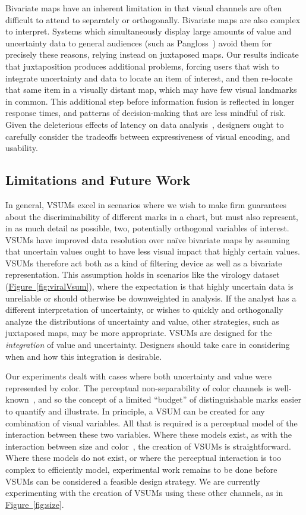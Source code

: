 \documentclass{vgtc}                          %
\newcommand{\figref}[1]{\hyperref[#1]{Figure~\ref*{#1}}}
\begin{document}
Bivariate maps have an inherent limitation in that visual channels are often difficult to attend to separately or orthogonally. Bivariate maps are also complex to interpret. Systems which simultaneously display large amounts of value and uncertainty data to general audiences (such as Pangloss~\cite{moritz2017trust}) avoid them for precisely these reasons, relying instead on juxtaposed maps. Our results indicate that juxtaposition produces additional problems, forcing users that wish to integrate uncertainty and data to locate an item of interest, and then re-locate that same item in a visually distant map, which may have few visual landmarks in common. This additional step before information fusion is reflected in longer response times, and patterns of decision-making that are less mindful of risk. Given the deleterious effects of latency on data analysis~\cite{liu2014effects}, designers ought to carefully consider the tradeoffs between expressiveness of visual encoding, and usability.

\subsection{Limitations and Future Work}
In general, VSUMs excel in scenarios where we wish to make firm guarantees about the discriminability of different marks in a chart, but must also represent, in as much detail as possible, two, potentially orthogonal variables of interest. VSUMs have improved data resolution over na\"ive bivariate maps by assuming that uncertain values ought to have less visual impact that highly certain values. VSUMs therefore act both as a kind of filtering device as well as a bivariate representation. This assumption holds in scenarios like the virology dataset (\figref{fig:viralVsum}), where the expectation is that highly uncertain data is unreliable or should otherwise be downweighted in analysis. If the analyst has a different interpretation of uncertainty, or wishes to quickly and orthogonally analyze the distributions of uncertainty and value, other strategies, such as juxtaposed maps, may be more appropriate. VSUMs are designed for the \emph{integration} of value and uncertainty. Designers should take care in considering when and how this integration is desirable.

Our experiments dealt with cases where both uncertainty and value were represented by color. The perceptual non-separability of color channels is well-known~\cite{garner1970integrality, ware2012information}, and so the concept of a limited ``budget'' of distinguishable marks easier to quantify and illustrate. In principle, a VSUM can be created for any combination of visual variables. All that is required is a perceptual model of the interaction between these two variables. Where these models exist, as with the interaction between size and color~\cite{stone2014engineering}, the creation of VSUMs is straightforward. Where these models do not exist, or where the perceptual interaction is too complex to efficiently model, experimental work remains to be done before VSUMs can be considered a feasible design strategy. We are currently experimenting with the creation of VSUMs using these other channels, as in \figref{fig:size}.
\end{document}
